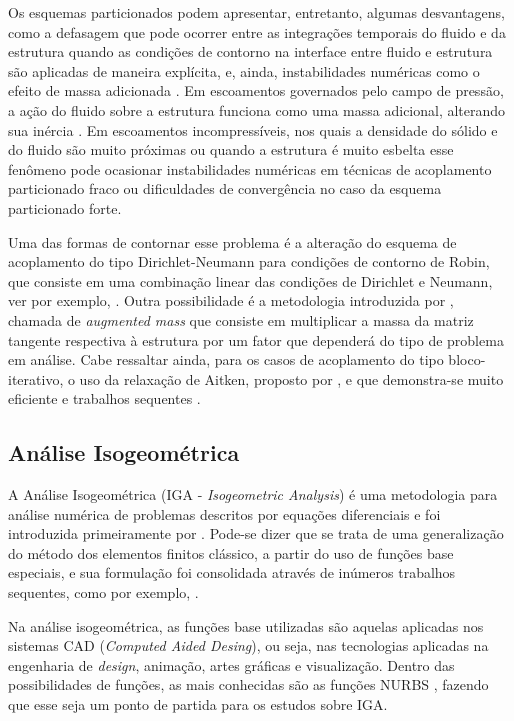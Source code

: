 \documentclass[tese_patricia.tex]{subfiles}
\begin{document}
Os esquemas particionados podem apresentar, entretanto, algumas desvantagens, como a defasagem que pode ocorrer entre as integrações temporais do fluido e da estrutura quando as condições de contorno na interface entre fluido e estrutura são aplicadas de maneira explícita, e, ainda, instabilidades numéricas como o efeito de massa adicionada \cite{FelippaPF:2001}. Em escoamentos governados pelo campo de pressão, a ação do fluido sobre a estrutura funciona como uma massa adicional, alterando sua inércia \cite{TallecM:2001}. Em escoamentos incompressíveis, nos quais a densidade do sólido e do fluido são muito próximas ou quando a estrutura é muito esbelta esse fenômeno pode ocasionar instabilidades numéricas em técnicas de acoplamento particionado fraco ou dificuldades de convergência no caso da esquema particionado forte. 

Uma das formas de contornar esse problema é a alteração do esquema de acoplamento do tipo Dirichlet-Neumann para condições de contorno de Robin, que consiste em uma combinação linear das condições de Dirichlet e Neumann, ver por exemplo, . Outra possibilidade é a metodologia introduzida por , chamada de \textit{augmented mass} que consiste em multiplicar a massa da matriz tangente respectiva à estrutura por um fator que dependerá do tipo de problema em análise. Cabe ressaltar ainda, para os casos de acoplamento do tipo bloco-iterativo, o uso da relaxação de Aitken, proposto por , e que demonstra-se muito eficiente e trabalhos sequentes \cite{KuttlerW:2008,FernandesCS:2019}.


\subsection{Análise Isogeométrica}
\label{igasection}

A Análise Isogeométrica (IGA - \textit{Isogeometric Analysis}) é uma metodologia para análise numérica de problemas descritos por equações diferenciais e foi introduzida primeiramente por . Pode-se dizer que se trata de uma generalização do método dos elementos finitos clássico, a partir do uso de funções base especiais, e sua formulação foi consolidada através de inúmeros trabalhos sequentes, como por exemplo, .

Na análise isogeométrica, as funções base utilizadas são aquelas aplicadas nos sistemas CAD (\textit{Computed Aided Desing}), ou seja, nas tecnologias aplicadas na engenharia de \textit{design}, animação, artes gráficas e visualização.  Dentro das possibilidades de funções, as mais conhecidas são as funções NURBS \cite{PiegT:1996}, fazendo que esse seja um ponto de partida para os estudos sobre IGA.
\end{document}
